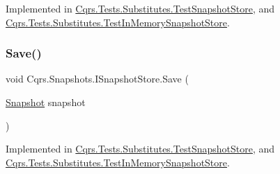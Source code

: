 Implemented in \hyperlink{classCqrs_1_1Tests_1_1Substitutes_1_1TestSnapshotStore_a8f07b513e21a7ed7ea0f52a41c9586ba}{Cqrs.\+Tests.\+Substitutes.\+Test\+Snapshot\+Store}, and \hyperlink{classCqrs_1_1Tests_1_1Substitutes_1_1TestInMemorySnapshotStore_a4e149196381a80cc9c53cdbb67b8dcaa}{Cqrs.\+Tests.\+Substitutes.\+Test\+In\+Memory\+Snapshot\+Store}.

\mbox{\label{interfaceCqrs_1_1Snapshots_1_1ISnapshotStore_a6e99c620115ce8a0648a83bf2ce05527}} 
\subsubsection{\texorpdfstring{Save()}{Save()}}
{\footnotesize\ttfamily void Cqrs.\+Snapshots.\+I\+Snapshot\+Store.\+Save (\begin{DoxyParamCaption}\item[{\hyperlink{classCqrs_1_1Snapshots_1_1Snapshot}{Snapshot}}]{snapshot }\end{DoxyParamCaption})}



Implemented in \hyperlink{classCqrs_1_1Tests_1_1Substitutes_1_1TestSnapshotStore_a223dbc9583120dec1469c1f84b863eae}{Cqrs.\+Tests.\+Substitutes.\+Test\+Snapshot\+Store}, and \hyperlink{classCqrs_1_1Tests_1_1Substitutes_1_1TestInMemorySnapshotStore_afec5ba3ed2b39625b3ccfb002d1c935e}{Cqrs.\+Tests.\+Substitutes.\+Test\+In\+Memory\+Snapshot\+Store}.


